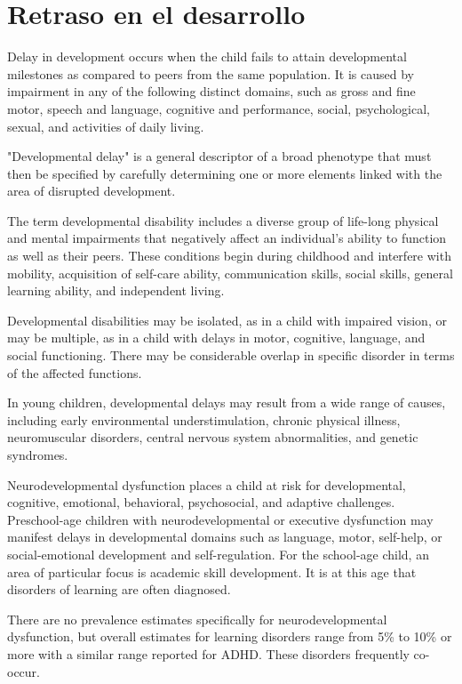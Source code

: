 \section{Retraso en el desarrollo}

Delay in development occurs when the child fails to attain developmental
milestones as compared to peers from the same population. It is caused by
impairment in any of the following distinct domains, such as gross and fine
motor, speech and language, cognitive and performance, social, psychological,
sexual, and activities of daily living. \cite{DevelopmentalDelay}

"Developmental delay" is a general descriptor of a broad phenotype that must
then be specified by carefully determining one or more elements linked with the
area of disrupted development. \cite{DevelopmentalDelay}

The term developmental disability includes a diverse group of life-long
physical and mental impairments that negatively affect an individual’s ability
to function as well as their peers. These conditions begin during childhood and
interfere with mobility, acquisition of self-care ability, communication
skills, social skills, general learning ability, and independent living.
\cite{Simms2023}

Developmental disabilities may be isolated, as in a child with impaired vision,
or may be multiple, as in a child with delays in motor, cognitive, language,
and social functioning. There may be considerable overlap in specific disorder
in terms of the affected functions. \cite{Simms2023}

In young children, developmental delays may result from a wide range of causes,
including early environmental understimulation, chronic physical illness,
neuromuscular disorders, central nervous system abnormalities, and genetic
syndromes. \cite{Simms2023}

Neurodevelopmental dysfunction places a child at risk for developmental,
cognitive, emotional, behavioral, psychosocial, and adaptive challenges.
Preschool-age children with neurodevelopmental or executive dysfunction may
manifest delays in developmental domains such as language, motor, self-help, or
social-emotional development and self-regulation. For the school-age child, an
area of particular focus is academic skill development. It is at this age that
disorders of learning are often diagnosed. \cite{Nelson49}

There are no prevalence estimates specifically for neurodevelopmental
dysfunction, but overall estimates for learning disorders range from 5\% to
10\% or more with a similar range reported for ADHD. These disorders frequently
co-occur.

